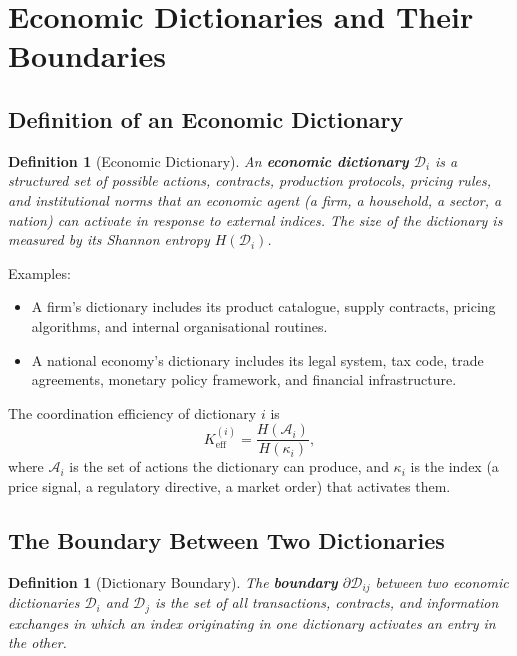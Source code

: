 \documentclass[12pt,a4paper]{article}
\newtheorem{definition}[theorem]{Definition}
\theoremstyle{remark}
\begin{document}
	\section{Economic Dictionaries and Their Boundaries}
	
	\subsection{Definition of an Economic Dictionary}
	
	\begin{definition}[Economic Dictionary]
		An \textbf{economic dictionary} \(\mathcal{D}_i\) is a structured set of possible actions, contracts, production protocols, pricing rules, and institutional norms that an economic agent (a firm, a household, a sector, a nation) can activate in response to external indices. The size of the dictionary is measured by its Shannon entropy \(H(\mathcal{D}_i)\).
	\end{definition}
	
	Examples:
	\begin{itemize}
		\item A firm's dictionary includes its product catalogue, supply contracts, pricing algorithms, and internal organisational routines.
		\item A national economy's dictionary includes its legal system, tax code, trade agreements, monetary policy framework, and financial infrastructure.
	\end{itemize}
	
	The coordination efficiency of dictionary \(i\) is
	\begin{equation}
		K_{\mathrm{eff}}^{(i)} = \frac{H(\mathcal{A}_i)}{H(\kappa_i)},
		\label{eq:keff_econ}
	\end{equation}
	where \(\mathcal{A}_i\) is the set of actions the dictionary can produce, and \(\kappa_i\) is the index (a price signal, a regulatory directive, a market order) that activates them.
	
	\subsection{The Boundary Between Two Dictionaries}
	
	\begin{definition}[Dictionary Boundary]
		The \textbf{boundary} \(\partial\mathcal{D}_{ij}\) between two economic dictionaries \(\mathcal{D}_i\) and \(\mathcal{D}_j\) is the set of all transactions, contracts, and information exchanges in which an index originating in one dictionary activates an entry in the other.
	\end{definition}
	
\end{document}
